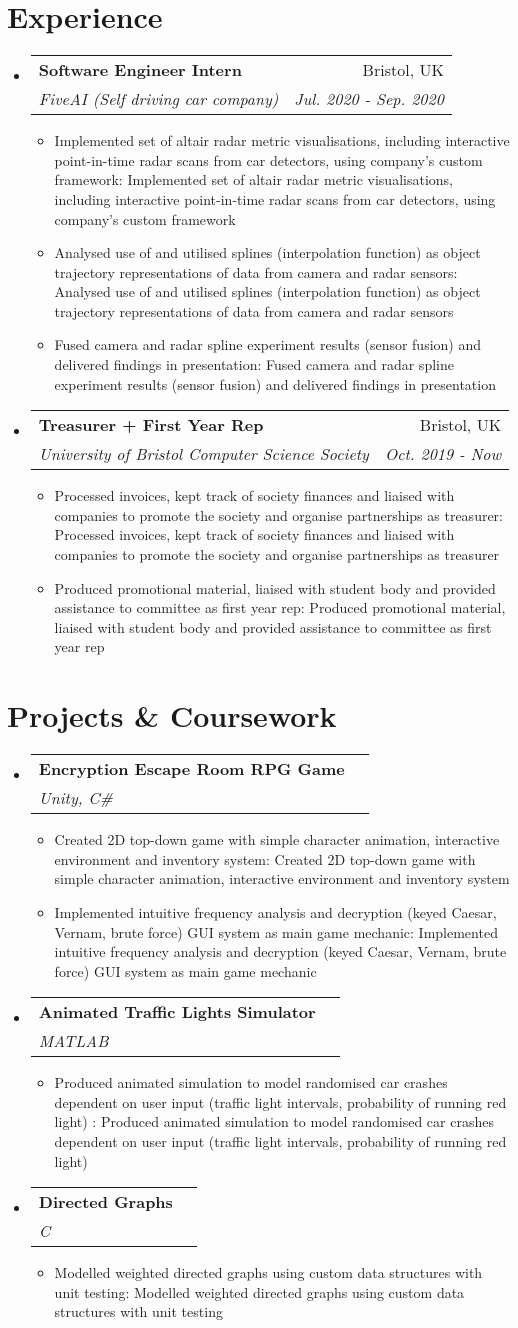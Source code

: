 \documentclass[a4paper,11pt]{article}
\makeatletter
\def \ifempty#1{\def\temp{#1} \ifx\temp\empty }
\newcommand{\resumeItem}[2]{
  \item\small{
  	\ifempty{#1}#2\else\textbf{#1}{: #2 \vspace{-2pt}}\fi
  }
}
\newcommand{\resumeSubheading}[4]{
  \vspace{-1pt}\item
    \begin{tabular*}{0.97\textwidth}{l@{\extracolsep{\fill}}r}
      \textbf{#1} & #2 \\
      \textit{\small#3} & \textit{\small #4} \\
    \end{tabular*}\vspace{-5pt}
}
\newcommand{\resumeSubHeadingListStart}{\begin{itemize}[leftmargin=*]}
\newcommand{\resumeSubHeadingListEnd}{\end{itemize}}
\newcommand{\resumeItemListStart}{\begin{itemize}}
\newcommand{\resumeItemListEnd}{\end{itemize}\vspace{-5pt}}
\makeatother
\begin{document}
\section{Experience}
  \resumeSubHeadingListStart
    \resumeSubheading
      {Software Engineer Intern}{Bristol, UK}
      {FiveAI (Self driving car company)}{Jul. 2020 - Sep. 2020}
      \resumeItemListStart
      	\resumeItem{}
          {Implemented set of altair radar metric visualisations, including interactive point-in-time radar scans from car detectors, using company's custom framework}
      	\resumeItem{}
          {Analysed use of and utilised splines (interpolation function) as object trajectory representations of data from camera and radar sensors}
        \resumeItem{}
          {Fused camera and radar spline experiment results (sensor fusion) and delivered findings in presentation}
        \resumeItemListEnd

    \resumeSubheading
      {Treasurer + First Year Rep}{Bristol, UK}
      {University of Bristol Computer Science Society}{Oct. 2019 - Now}
      \resumeItemListStart
      	\resumeItem{}
          {Processed invoices, kept track of society finances and liaised with companies to promote the society and organise partnerships as treasurer}
        \resumeItem{}
          {Produced promotional material, liaised with student body and provided assistance to committee as first year rep}
      \resumeItemListEnd


  \resumeSubHeadingListEnd


\section{Projects \& Coursework}
  \resumeSubHeadingListStart
    \resumeSubheading
      {Encryption Escape Room RPG Game}{}
      {Unity, C\#}{}
      \resumeItemListStart
        \resumeItem{}
          {Created 2D top-down game with simple character animation, interactive environment and inventory system}
        \resumeItem{}
          {Implemented intuitive frequency analysis and decryption (keyed Caesar, Vernam, brute force) GUI system as main game mechanic}
      \resumeItemListEnd
    \resumeSubheading
      {Animated Traffic Lights Simulator}{}
      {MATLAB}{}
      \resumeItemListStart
        \resumeItem{}
          {Produced animated simulation to model randomised car crashes dependent on user input (traffic light intervals, probability of running red light) }
      \resumeItemListEnd
    \resumeSubheading
      {Directed Graphs}{}
      {C}{}
      \resumeItemListStart
        \resumeItem{}
          {Modelled weighted directed graphs using custom data structures with unit testing}
      \resumeItemListEnd
  \resumeSubHeadingListEnd
\end{document}
